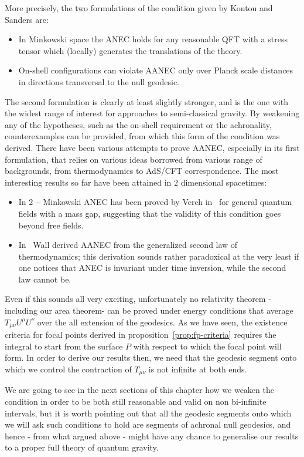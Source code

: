 More precisely, the two formulations of the condition given by Kontou and Sanders are:
\begin{itemize}
    \item[\ding{99}] In Minkowski space the ANEC holds for any reasonable QFT with a stress tensor which (locally) generates the translations of the theory.
    \item[\ding{99}] On-shell configurations can violate AANEC only over Planck scale distances in directions transversal to the null geodesic.
\end{itemize}
The second formulation is clearly at least slightly stronger, and is the one with the widest range of interest for approaches to semi-classical gravity. By weakening any of the hypotheses, such as the on-shell requirement or the achronality, counterexamples can be provided, from which this form of the condition was derived. 
There have been various attempts to prove AANEC, especially in its first formulation, that relies on various ideas borrowed from various range of backgrounds, from thermodynamics to AdS/CFT correspondence. The most interesting results so far have been attained in \(2\) dimensional spacetimes:
\begin{itemize}
    \item[\ding{99}] In \(2-\)Minkowski ANEC has been proved by Verch in~\cite[]{verch2000averaged} for general quantum fields with a mass gap, suggesting that the validity of this condition goes beyond free fields.
    \item[\ding{99}] In~\cite[]{wall2010proving} Wall derived AANEC from the generalized second law of thermodynamics; this derivation sounds rather paradoxical at the very least if one notices that ANEC is invariant under time inversion, while the second law cannot be.
\end{itemize}

Even if this sounds all very exciting, unfortunately no relativity theorem -including our area theorem- can be proved under energy conditions that average \(T_{\mu\nu}U^{\mu}U^{\nu}\) over the all extension of the geodesics. As we have seen, the existence criteria for focal points derived in proposition~\ref{prop:fp-criteria} requires the integral to start from the surface \(P\) with respect to which the focal point will form. In order to derive our results then, we need that the geodesic segment onto which we control the contraction of \(T_{\mu\nu}\) is not infinite at both ends. 

\noindent
We are going to see in the next sections of this chapter how we weaken the condition in order to be both still reasonable and valid on non bi-infinite intervals, but it is worth pointing out that all the geodesic segments onto which we will ask such conditions to hold are segments of achronal null geodesics, and hence - from what argued above - might have any chance to generalise our results to a proper full theory of quantum gravity.

